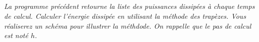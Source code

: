 \documentclass[10pt]{article}
\newif\ifprof
\begin{document}
\subparagraph{}\textit{La programme précédent retourne la liste des puissances dissipées à chaque temps de calcul. Calculer l'énergie dissipée en utilisant la méthode des trapèzes. Vous réaliserez un schéma pour illustrer la méthdode. On rappelle que le pas de calcul est noté $h$.}
\ifprof

\begin{corrige}
\end{corrige}
\else
\fi
\end{document}
